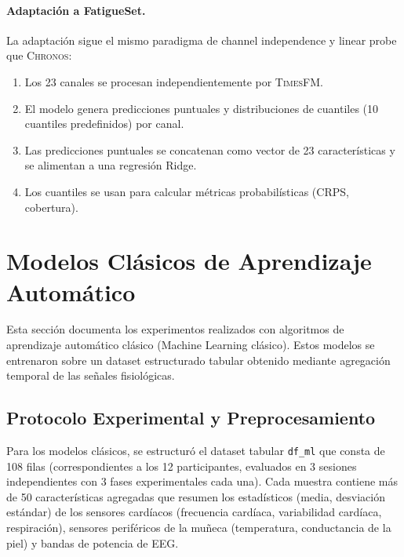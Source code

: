 \documentclass[12pt, a4paper]{article}
\newcommand{\code}[1]{\texttt{#1}}
\newcommand{\chronos}{\textsc{Chronos}}
\newcommand{\timesfm}{\textsc{TimesFM}}
\begin{document}
\paragraph{Adaptación a FatigueSet.}
La adaptación sigue el mismo paradigma de channel independence y linear probe que \chronos{}:
\begin{enumerate}
    \item Los 23 canales se procesan independientemente por \timesfm{}.
    \item El modelo genera predicciones puntuales y distribuciones de cuantiles (10 cuantiles predefinidos) por canal.
    \item Las predicciones puntuales se concatenan como vector de 23 características y se alimentan a una regresión Ridge.
    \item Los cuantiles se usan para calcular métricas probabilísticas (CRPS, cobertura).
\end{enumerate}


\section{Modelos Clásicos de Aprendizaje Automático}
\label{sec:modelos_clasicos}

Esta sección documenta los experimentos realizados con algoritmos de aprendizaje automático clásico (Machine Learning clásico). Estos modelos se entrenaron sobre un dataset estructurado tabular obtenido mediante agregación temporal de las señales fisiológicas.

\subsection{Protocolo Experimental y Preprocesamiento}

Para los modelos clásicos, se estructuró el dataset tabular \code{df\_ml} que consta de 108 filas (correspondientes a los 12 participantes, evaluados en 3 sesiones independientes con 3 fases experimentales cada una). Cada muestra contiene más de 50 características agregadas que resumen los estadísticos (media, desviación estándar) de los sensores cardíacos (frecuencia cardíaca, variabilidad cardíaca, respiración), sensores periféricos de la muñeca (temperatura, conductancia de la piel) y bandas de potencia de EEG.
\end{document}
